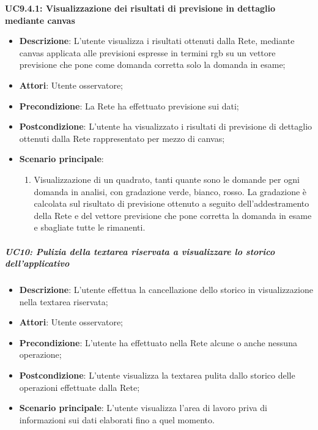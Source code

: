 \textbf{UC9.4.1: Visualizzazione dei risultati di previsione in dettaglio mediante canvas}\mbox{}
\label{UC9.4.1: Visualizzazione dei risultati di previsione in dettaglio mediante canvas}
\noindent
\begin{itemize}
\item \textbf{Descrizione}: L'utente visualizza i risultati ottenuti dalla Rete, mediante canvas applicata alle previsioni espresse in termini rgb su un vettore previsione che pone come domanda corretta solo la domanda in esame;
\item \textbf{Attori}: Utente osservatore;
\item \textbf{Precondizione}: La Rete ha effettuato previsione sui dati;
\item \textbf{Postcondizione}: L'utente ha visualizzato i risultati di previsione di dettaglio ottenuti dalla Rete rappresentato per mezzo di canvas; 
\item \textbf{Scenario principale}:
\begin{enumerate}
\item Visualizzazione di un quadrato, tanti quante sono le domande per ogni domanda in analisi, con gradazione verde, bianco, rosso. La gradazione \`e calcolata sul risultato di previsione ottenuto a seguito dell'addestramento della Rete e del vettore previsione che pone corretta la domanda in esame e sbagliate tutte le rimanenti.
\end{enumerate}
\end{itemize}

\subparagraph{UC10: Pulizia della textarea riservata a visualizzare lo storico dell'applicativo}\mbox{}
\label{UC10: Pulizia della textarea riservata a visualizzare lo storico dell'applicativo}
\noindent
\begin{itemize}
\item \textbf{Descrizione}: L'utente effettua la cancellazione dello storico in visualizzazione nella textarea riservata;
\item \textbf{Attori}: Utente osservatore;
\item \textbf{Precondizione}: L'utente ha effettuato nella Rete alcune o anche nessuna operazione;
\item \textbf{Postcondizione}: L'utente visualizza la textarea pulita dallo storico delle operazioni effettuate dalla Rete;
\item \textbf{Scenario principale}: L'utente visualizza l'area di lavoro priva di informazioni sui dati elaborati fino a quel momento.
\end{itemize}

